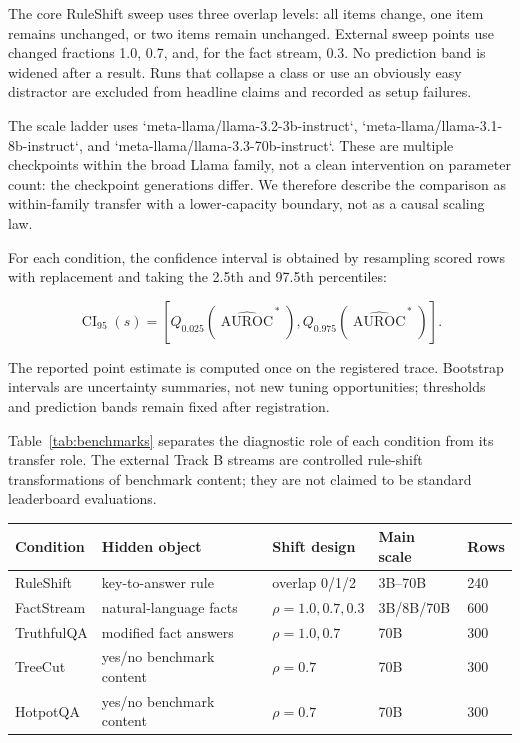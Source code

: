 \documentclass[pdflatex,sn-basic]{sn-jnl}
\makeatletter
\theoremstyle{definition}
\newenvironment{eqbox}%
{\par\vspace{9pt}\noindent\begin{lrbox}{\eqsavebox}\begin{minipage}{\dimexpr\linewidth-18pt}\boldmath}%
{\end{minipage}\end{lrbox}\setlength{\fboxsep}{8pt}\noindent\colorbox{eqgrey}{\usebox{\eqsavebox}}\par\vspace{7pt}}
\def\tablebodyfont{\reset@font\fontsize{10.5bp}{12.5bp}\selectfont}
\renewenvironment{table}[1][]%
{\begin{tableorg}[#1]%
  \begin{center}%
  \begin{threeparttable}%
  \tablebodyfont%
  \setlength{\parskip}{0pt}%
  \renewcommand{\arraystretch}{1.20}%
  \renewcommand\footnotetext[2][]{{\removelastskip\vskip3pt%
    \let\tablebodyfont\tablefootnotefont%
    \hskip0pt\if!##1!\else{\smash{$^{##1}$}}\fi##2\par}}%
}{\end{threeparttable}\end{center}\end{tableorg}}
\makeatother
\begin{document}
The core RuleShift sweep uses three overlap levels: all items change, one item remains
unchanged, or two items remain unchanged. External sweep points use changed fractions 1.0,
0.7, and, for the fact stream, 0.3. No prediction band is widened after a result. Runs that
collapse a class or use an obviously easy distractor are excluded from headline claims and
recorded as setup failures.

The scale ladder uses `meta-llama/llama-3.2-3b-instruct`,
`meta-llama/llama-3.1-8b-instruct`, and `meta-llama/llama-3.3-70b-instruct`. These are
multiple checkpoints within the broad Llama family, not a clean intervention on parameter
count: the checkpoint generations differ. We therefore describe the comparison as
within-family transfer with a lower-capacity boundary, not as a causal scaling law.

For each condition, the confidence interval is obtained by resampling scored rows with
replacement and taking the 2.5th and 97.5th percentiles:

\begin{eqbox}
\[
\operatorname{CI}_{95}(s)=\left[Q_{0.025}
\left(\widehat{\operatorname{AUROC}}^{\,*}\right),
Q_{0.975}\left(\widehat{\operatorname{AUROC}}^{\,*}\right)\right].
\]
\end{eqbox}

The reported point estimate is computed once on the registered trace. Bootstrap intervals are
uncertainty summaries, not new tuning opportunities; thresholds and prediction bands remain
fixed after registration.

Table~\ref{tab:benchmarks} separates the diagnostic role of each condition from its transfer
role. The external Track B streams are controlled rule-shift transformations of benchmark
content; they are not claimed to be standard leaderboard evaluations.

\begin{table}[!ht]
\centering\footnotesize
\setlength{\tabcolsep}{3pt}
\begin{tabular}{p{24mm}p{25mm}p{28mm}p{18mm}p{16mm}}
\toprule
Condition & Hidden object & Shift design & Main scale & Rows\\
\midrule
RuleShift & key-to-answer rule & overlap 0/1/2 & 3B--70B & 240\\
FactStream & natural-language facts & $\rho=1.0,0.7,0.3$ & 3B/8B/70B & 600\\
TruthfulQA & modified fact answers & $\rho=1.0,0.7$ & 70B & 300\\
TreeCut & yes/no benchmark content & $\rho=0.7$ & 70B & 300\\
HotpotQA & yes/no benchmark content & $\rho=0.7$ & 70B & 300\\
\bottomrule
\end{tabular}
\caption{Evaluation suite. Unless explicitly pooled, $n$ is per listed condition: RuleShift
has 240 scored rows per overlap condition; FactStream has 600 per changed fraction and
backbone; each external benchmark has 300 per benchmark and shift fraction.}
\label{tab:benchmarks}
\end{table}
\end{document}

